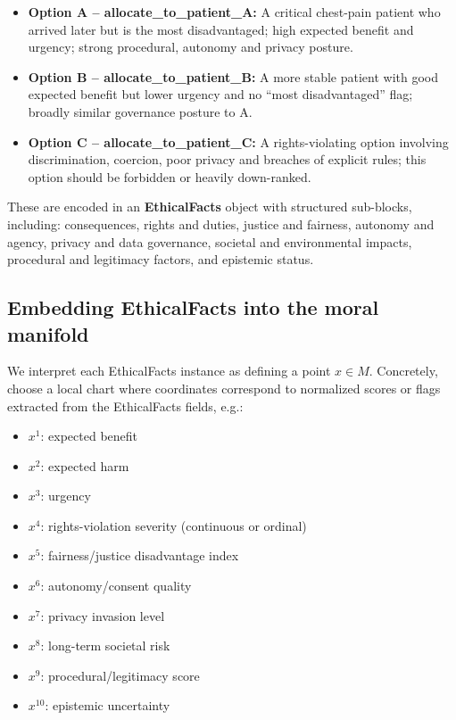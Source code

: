 \documentclass[12pt]{article}
\theoremstyle{remark}
\begin{document}
\begin{itemize}
    \item \textbf{Option A -- allocate\_to\_patient\_A:}
    A critical chest-pain patient who arrived later but is the most disadvantaged; high expected benefit and urgency; strong procedural, autonomy and privacy posture.

    \item \textbf{Option B -- allocate\_to\_patient\_B:}
    A more stable patient with good expected benefit but lower urgency and no ``most disadvantaged'' flag; broadly similar governance posture to A.

    \item \textbf{Option C -- allocate\_to\_patient\_C:}
    A rights-violating option involving discrimination, coercion, poor privacy and breaches of explicit rules; this option should be forbidden or heavily down-ranked.
\end{itemize}

These are encoded in an \textbf{EthicalFacts} object with structured sub-blocks, including: consequences, rights and duties, justice and fairness, autonomy and agency, privacy and data governance, societal and environmental impacts, procedural and legitimacy factors, and epistemic status.

\subsection{Embedding EthicalFacts into the moral manifold}

We interpret each EthicalFacts instance as defining a point $x \in M$. Concretely, choose a local chart where coordinates correspond to normalized scores or flags extracted from the EthicalFacts fields, e.g.:

\begin{itemize}
    \item $x^1$: expected benefit
    \item $x^2$: expected harm
    \item $x^3$: urgency
    \item $x^4$: rights-violation severity (continuous or ordinal)
    \item $x^5$: fairness/justice disadvantage index
    \item $x^6$: autonomy/consent quality
    \item $x^7$: privacy invasion level
    \item $x^8$: long-term societal risk
    \item $x^9$: procedural/legitimacy score
    \item $x^{10}$: epistemic uncertainty
\end{itemize}
\end{document}
